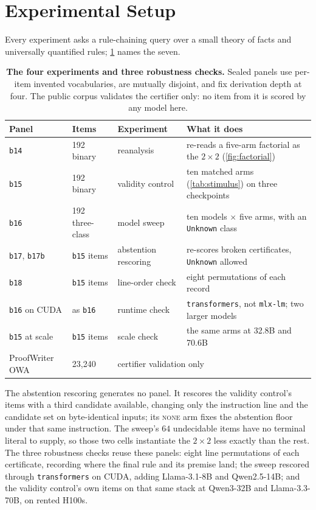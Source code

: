 \documentclass{article}
\begin{document}
\section{Experimental Setup}

Every experiment asks a rule-chaining query over a small theory of facts and
universally quantified rules; \cref{tab:panels} names the seven.

\begin{table}[tb]
\centering\small
\caption{\textbf{The four experiments and three robustness checks.} Sealed panels
use per-item invented vocabularies, are mutually disjoint, and fix derivation
depth at four. The public corpus validates the certifier only: no item from it
is scored by any model here.}
\label{tab:panels}
\footnotesize
\begin{tabular}{@{}l@{\hskip 1em}l@{\hskip 1em}l@{\hskip 1em}l@{}}
\toprule
Panel & Items & Experiment & What it does \\
\midrule
\texttt{b14} & 192 binary & reanalysis & re-reads a five-arm factorial as the $2\times2$ (\cref{fig:factorial}) \\
\texttt{b15} & 192 binary & validity control & ten matched arms (\cref{tab:stimulus}) on three checkpoints \\
\texttt{b16} & 192 three-class & model sweep & ten models $\times$ five arms, with an \texttt{Unknown} class \\
\texttt{b17}, \texttt{b17b} & \texttt{b15} items & abstention rescoring & re-scores broken certificates, \texttt{Unknown} allowed \\
\midrule
\texttt{b18} & \texttt{b15} items & line-order check & eight permutations of each record \\
\texttt{b16} on CUDA & as \texttt{b16} & runtime check & \texttt{transformers}, not \texttt{mlx-lm}; two larger models \\
\texttt{b15} at scale & \texttt{b15} items & scale check & the same arms at 32.8B and 70.6B \\
\midrule
ProofWriter OWA & 23{,}240 & \multicolumn{2}{l}{certifier validation only \citep{tafjord2020proofwriter}} \\
\bottomrule
\end{tabular}
\end{table}

The abstention rescoring generates no panel. It rescores the validity control's
items with a third candidate available, changing only the instruction line and
the candidate set on byte-identical inputs; its \textsc{none} arm fixes the
abstention floor under that same instruction. The sweep's $64$ undecidable items
have no terminal literal to supply, so those two cells instantiate the
$2\times2$ less exactly than the rest. The three robustness checks reuse these
panels: eight line permutations of each certificate, recording where the final
rule and its premise land; the sweep rescored through \texttt{transformers} on
CUDA, adding Llama-3.1-8B and Qwen2.5-14B; and the validity control's own items
on that same stack at Qwen3-32B \citep{yang2025qwen3} and Llama-3.3-70B, on
rented H100s.
\end{document}
